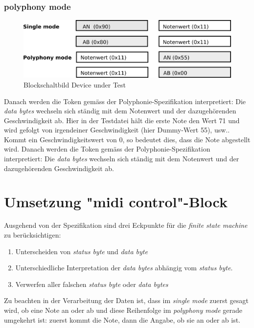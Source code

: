 \subsubsection{polyphony mode}
\begin{figure}[H]
	\centering
	\includegraphics[width=1\textwidth]{images/midi_interface/MIDI_Spezifikation_Datenfolge.png}
	\caption{Blockschaltbild Device under Test}
	\label{fig.testbench_polypphon_mode}
\end{figure}
Danach werden die Token gemäss der Polyphonie-Spezifikation interpretiert: Die \textit{data bytes} wechseln sich ständig mit dem Notenwert und der dazugehörenden Geschwindigkeit ab. Hier in der Testdatei hält die erste Note den Wert 71 und wird gefolgt von irgendeiner Geschwindigkeit (hier Dummy-Wert 55), usw.. Kommt ein Geschwindigkeitswert von 0, so bedeutet dies, dass die Note abgestellt wird.
Danach werden die Token gemäss der Polyphonie-Spezifikation interpretiert: Die \textit{data bytes} wechseln sich ständig mit dem Notenwert und der dazugehörenden Geschwindigkeit ab. 

\section{Umsetzung "midi control"-Block}\label{sect.midi_umsetzung}
Ausgehend von der Spezifikation sind drei Eckpunkte für die \textit{finite state machine} zu berücksichtigen:\\
\begin{enumerate}
	\item Unterscheiden von \textit{status byte} und \textit{data byte}
	\item Unterschiedliche Interpretation der \textit{data bytes} abhängig vom \textit{status byte}.
	\item Verwerfen aller falschen \textit{status byte} oder \textit{data bytes}
\end{enumerate}

Zu beachten in der Verarbeitung der Daten ist, dass im \textit{single mode} zuerst gesagt wird, ob eine Note an oder ab und diese Reihenfolge im \textit{polyphony mode} gerade umgekehrt ist: zuerst kommt die Note, dann die Angabe, ob sie an oder ab ist.


